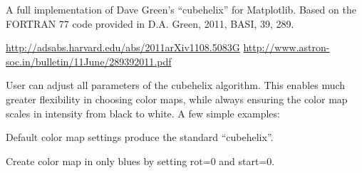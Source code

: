 \documentclass[a4paper,10pt,english]{sphinxmanual}
\begin{document}

\begin{fulllineitems}
\label{ryplot:pyradi.ryplot.cubehelixcmap}
A full implementation of Dave Green's ``cubehelix'' for Matplotlib.
Based on the FORTRAN 77 code provided in 
D.A. Green, 2011, BASI, 39, 289.

\href{http://adsabs.harvard.edu/abs/2011arXiv1108.5083G}{http://adsabs.harvard.edu/abs/2011arXiv1108.5083G}
\href{http://www.astron-soc.in/bulletin/11June/289392011.pdf}{http://www.astron-soc.in/bulletin/11June/289392011.pdf}

User can adjust all parameters of the cubehelix algorithm. 
This enables much greater flexibility in choosing color maps, while 
always ensuring the color map scales in intensity from black 
to white. A few simple examples:

Default color map settings produce the standard ``cubehelix''.

Create color map in only blues by setting rot=0 and start=0.


\end{fulllineitems}
\end{document}
